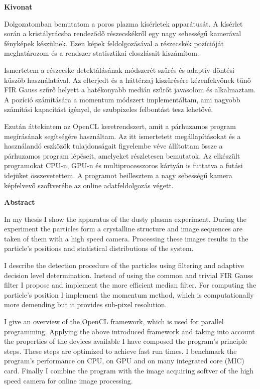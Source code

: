 \begin{center}
	\huge
	\textbf{Kivonat}
\end{center}


	Dolgozatomban bemutatom a poros plazma kísérletek apparátusát.
	A kísérlet során a kristályrácsba rendeződő részecskékről egy nagy sebességű kamerával fényképek készülnek.
	Ezen képek feldolgozásával a részecskék pozícióját meghatározom és a rendszer statisztikai eloszlásait kiszámítom.
	
	Ismertetem a részecske detektálásának módszerét szűrés és adaptív döntési küszöb használatával.
	Az elterjedt és a háttérzaj kiszűrésére kézenfekvőnek tűnő FIR Gauss szűrő helyett a hatékonyabb medián szűrőt javasolom és alkalmaztam.
	A pozíció számítására a momentum módszert implementáltam, ami nagyobb számítási kapacitást igényel, de szubpixeles felbontást tesz lehetővé.
	
	Ezután áttekintem az OpenCL keretrendszert, amit a párhuzamos program megírásának segítségére használtam.
	Az itt ismertetett megállapításokat és a használandó eszközök tulajdonságait figyelembe véve állítottam össze a párhuzamos program lépéseit, amelyeket részletesen bemutatok.
	Az elkészült programokat CPU-n, GPU-n és multiprocesszoros kártyán is futtatva a futási idejüket összevetettem.
	A programot beillesztem a nagy sebességű kamera képfelvevő szoftverébe az online adatfeldolgozás végett.

\newpage


\begin{center}
	\huge
	\textbf{Abstract}
\end{center}

	In my thesis I show the apparatus of the dusty plasma experiment.
	During the experiment the particles form a crystalline structure
        and image sequences are taken of them with a high speed camera.
	Processing these images results in the particle's positions
        and statistical distributions of the system.
	
	I describe the detection procedure of the particles using
        filtering and adaptive decision level determination.
	Instead of using the common and trivial FIR Gauss filter I
        propose and implement the more efficient median filter.
	For computing the particle's position I implement the momentum
        method, which is computationally more demending but it provides sub-pixel resolution.
	
	I give an overview of the OpenCL framework, which is used for parallel programming.
	Applying the above introduced framework and taking into account
        the properties of the devices available I have composed the
        program's principle steps.
	These steps are optimized to achieve fast run times.
	I benchmark the program's performance on CPU, on GPU and on
        many integrated core (MIC) card.
	Finally I combine the program with the image acquiring
        softver of the high speed camera for online image processing.
	
